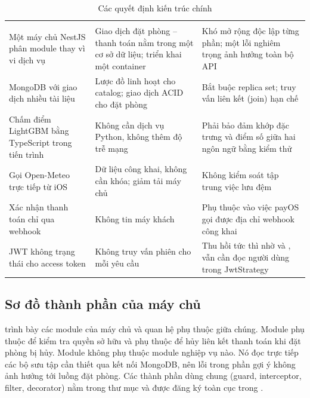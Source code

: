 \begin{rtable}
\begin{longtable}{|L{3.6cm}|L{5.4cm}|L{5.8cm}|}
\caption{Các quyết định kiến trúc chính}\label{tab:arch-decisions}\\
\hline
{} &  &  \\ \hline
\endfirsthead
\hline
{} &  &  \\ \hline
\endhead
Một máy chủ NestJS phân module thay vì vi dịch vụ & Giao dịch đặt phòng -- thanh toán nằm trong một cơ sở dữ liệu; triển khai một container & Khó mở rộng độc lập từng phần; một lỗi nghiêm trọng ảnh hưởng toàn bộ API \\ \hline
MongoDB với giao dịch nhiều tài liệu & Lược đồ linh hoạt cho catalog; giao dịch ACID cho đặt phòng & Bắt buộc replica set; truy vấn liên kết (join) hạn chế \\ \hline
Chấm điểm LightGBM bằng TypeScript trong tiến trình & Không cần dịch vụ Python, không thêm độ trễ mạng & Phải bảo đảm khớp đặc trưng và điểm số giữa hai ngôn ngữ bằng kiểm thử \\ \hline
Gọi Open-Meteo trực tiếp từ iOS & Dữ liệu công khai, không cần khóa; giảm tải máy chủ & Không kiểm soát tập trung việc lưu đệm \\ \hline
Xác nhận thanh toán chỉ qua webhook & Không tin máy khách & Phụ thuộc vào việc payOS gọi được địa chỉ webhook công khai \\ \hline
JWT không trạng thái cho access token & Không truy vấn phiên cho mỗi yêu cầu & Thu hồi tức thì nhờ  và , vẫn cần đọc người dùng trong JwtStrategy \\ \hline
\end{longtable}
\end{rtable}

\subsection{Sơ đồ thành phần của máy chủ}

 trình bày các module của máy chủ và quan hệ phụ thuộc giữa chúng. Module  phụ thuộc  để kiểm tra quyền sở hữu và phụ thuộc  để hủy liên kết thanh toán khi đặt phòng bị hủy. Module  không phụ thuộc module nghiệp vụ nào. Nó đọc trực tiếp các bộ sưu tập cần thiết qua kết nối MongoDB, nên lỗi trong phần gợi ý không ảnh hưởng tới luồng đặt phòng. Các thành phần dùng chung (guard, interceptor, filter, decorator) nằm trong thư mục  và được đăng ký toàn cục trong .

